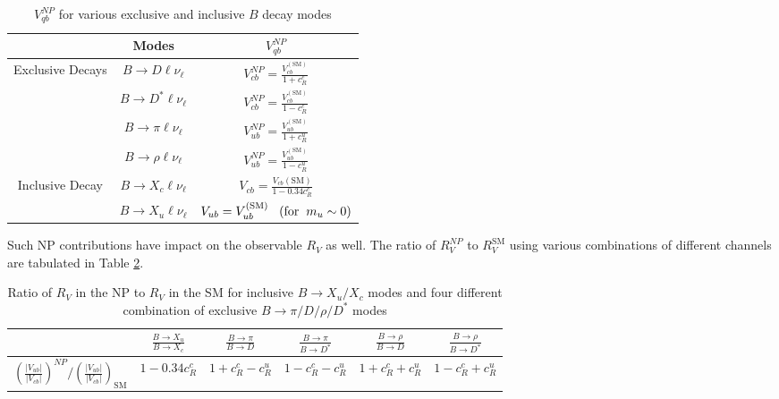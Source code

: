 \documentclass[a4paper,11pt]{article}
\begin{document}
    	\begin{table}[h]
    	\centering
    	\renewcommand{\arraystretch}{2}
    \begin{tabular}{ |c| c|c| }
    \hline
    {}&{ Modes } & {$V_{qb}^{NP} $} \\ \hline
\multirow{4}{*}{Exclusive Decays}   &{$B\to D \ell \nu_{\ell}$}& {$V_{cb}^{NP}=\frac{V_{cb}^{(\text{SM})}}{1+c_R^c }$}   \\

    &{$B\to D^* \ell \nu_{\ell}$}& {$V_{cb}^{NP}=\frac{V_{cb}^{(\text{SM})}}{1-c_R^c }$}   \\ 

    &{$B\to \pi \ell \nu_{\ell}$}& {$V_{ub}^{NP}=\frac{V_{ub}^{(\text{SM})}}{1+c_R^u }$}   \\ 
    
    &{$B\to \rho \ell \nu_{\ell}$}& {$V_{ub}^{NP}=\frac{V_{ub}^{(\text{SM})}}{1-c_R^u }$}   \\ \hline
    \multirow{2}{*}{Inclusive Decay}&{$ B\to X_c \ell \nu_{\ell}$}& {$V_{cb}=\frac{V_{cb}(\text{SM})}{1-0.34c_R^c }$}   \\ 
    
    &{$B\to X_u \ell \nu_{\ell}$}& {$V_{ub}=V_{ub}^{(\text{SM})} \hspace{0.3cm}(\text{for} \hspace{0.2cm}m_u\sim 0)$}   \\ \hline
    \end{tabular}
	    \caption{$V_{qb}^{NP}$ for various exclusive and inclusive $B$ decay modes }
	    \label{tabel1}
	\end{table}
Such NP contributions have impact on the observable $R_V$ as well. The ratio of $R_V^{NP}$ to $R_V^{\text{SM}}$ using various combinations of different channels are tabulated in Table \ref{table2}.
    	\begin{table}[h]
    	\centering
    	\renewcommand{\arraystretch}{2}
    \begin{tabular}{ |c| c| c|c|c|c|}
    \hline
    {  } & { $\frac{B\to X_u}{B\to X_c}$} & {$\frac{B\to \pi}{B\to D}$} & {$\frac{B\to \pi}{B\to D^*}$} & {$\frac{B\to \rho}{B\to D}$} & 
    {$\frac{B\to \rho}{B\to D^*}$}\\
    \hline
    {$\left(\frac{|V_{ub}|}{|V_{cb}|}\right)^{NP}/\left(\frac{|V_{ub}|}{|V_{cb}|}\right)_{\text{SM}}$}& {$1-0.34 c_R^c$} & {$1+c_R^c-c_R^u$} & {$1-c_R^c-c_R^u$} & {$1+c_R^c+c_R^u$} & {$1-c_R^c+c_R^u$}    \\
    \hline
    \end{tabular}
	    \caption{Ratio of $R_V$ in the NP to $R_V$ in the SM for inclusive $B\to X_u/ X_c$ modes and 
	    four different combination of exclusive $B\to \pi/D/\rho/D^*$ modes }
	    \label{table2}
	\end{table}
\end{document}
